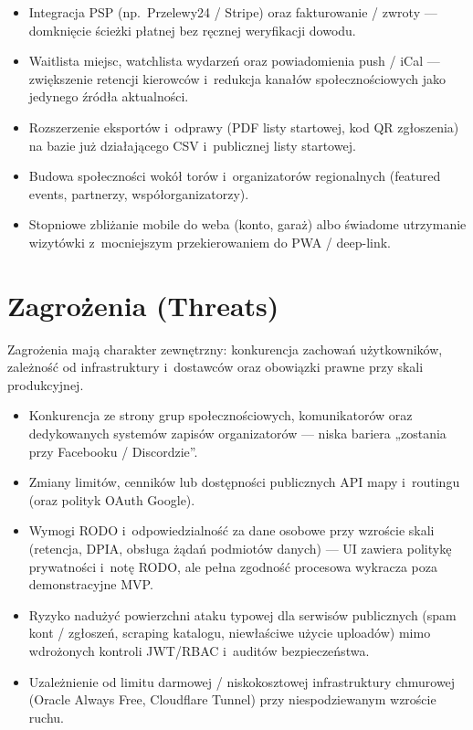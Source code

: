 \documentclass{sprz}
\begin{document}
\begin{itemize}
  \item Integracja PSP (np.\ Przelewy24 / Stripe) oraz fakturowanie / zwroty --- domknięcie ścieżki płatnej bez ręcznej weryfikacji dowodu.
  \item Waitlista miejsc, watchlista wydarzeń oraz powiadomienia push / iCal --- zwiększenie retencji kierowców i~redukcja kanałów społecznościowych jako jedynego źródła aktualności.
  \item Rozszerzenie eksportów i~odprawy (PDF listy startowej, kod QR zgłoszenia) na bazie już działającego CSV i~publicznej listy startowej.
  \item Budowa społeczności wokół torów i~organizatorów regionalnych (featured events, partnerzy, współorganizatorzy).
  \item Stopniowe zbliżanie mobile do weba (konto, garaż) albo świadome utrzymanie wizytówki z~mocniejszym przekierowaniem do PWA / deep-link.
\end{itemize}

\section{Zagrożenia (Threats)}
Zagrożenia mają charakter zewnętrzny: konkurencja zachowań użytkowników, zależność od infrastruktury i~dostawców oraz obowiązki prawne przy skali produkcyjnej.

\begin{itemize}
  \item Konkurencja ze strony grup społecznościowych, komunikatorów oraz dedykowanych systemów zapisów organizatorów --- niska bariera „zostania przy Facebooku / Discordzie”.
  \item Zmiany limitów, cenników lub dostępności publicznych API mapy i~routingu (oraz polityk OAuth Google).
  \item Wymogi RODO i~odpowiedzialność za dane osobowe przy wzroście skali (retencja, DPIA, obsługa żądań podmiotów danych) --- UI zawiera politykę prywatności i~notę RODO, ale pełna zgodność procesowa wykracza poza demonstracyjne MVP.
  \item Ryzyko nadużyć powierzchni ataku typowej dla serwisów publicznych (spam kont / zgłoszeń, scraping katalogu, niewłaściwe użycie uploadów) mimo wdrożonych kontroli JWT/RBAC i~auditów bezpieczeństwa.
  \item Uzależnienie od limitu darmowej / niskokosztowej infrastruktury chmurowej (Oracle Always Free, Cloudflare Tunnel) przy niespodziewanym wzroście ruchu.
\end{itemize}
\end{document}
